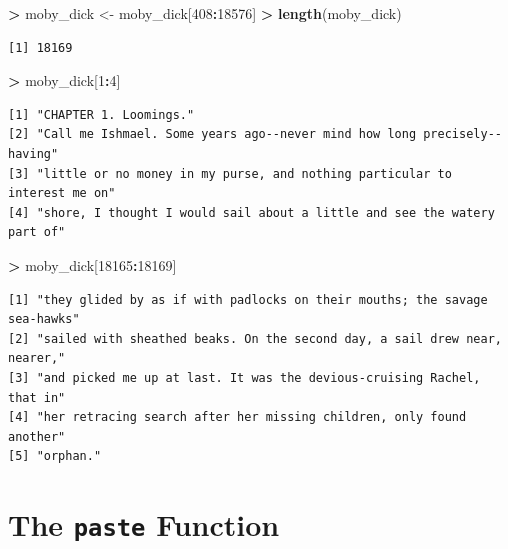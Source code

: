 \documentclass[
]{krantz}
\makeatletter
\newenvironment{Shaded}{\begin{snugshade}}{\end{snugshade}}
\newcommand{\DecValTok}[1]{\textcolor[rgb]{0.06,0.06,0.06}{#1}}
\newcommand{\KeywordTok}[1]{\textcolor[rgb]{0.27,0.27,0.27}{\textbf{#1}}}
\newcommand{\NormalTok}[1]{#1}
\newcommand{\OperatorTok}[1]{\textcolor[rgb]{0.43,0.43,0.43}{\textbf{#1}}}
\newcommand{\StringTok}[1]{\textcolor[rgb]{0.5,0.5,0.5}{#1}}
\newenvironment{kframe}{%
\medskip{}
\setlength{\fboxsep}{.8em}
 \def\at@end@of@kframe{}%
 \ifinner\ifhmode%
  \def\at@end@of@kframe{\end{minipage}}%
  \begin{minipage}{\columnwidth}%
 \fi\fi%
 \def\FrameCommand##1{\hskip\@totalleftmargin \hskip-\fboxsep
 \colorbox{shadecolor}{##1}\hskip-\fboxsep
     \hskip-\linewidth \hskip-\@totalleftmargin \hskip\columnwidth}%
 \MakeFramed {\advance\hsize-\width
   \@totalleftmargin\z@ \linewidth\hsize
   \@setminipage}}%
 {\par\unskip\endMakeFramed%
 \at@end@of@kframe}
\renewenvironment{Shaded}{\begin{kframe}}{\end{kframe}}
\makeatother
\begin{document}
\begin{Shaded}
\begin{Highlighting}[]
\OperatorTok{\textgreater{}}\StringTok{ }\NormalTok{moby\_dick \textless{}{-}}\StringTok{ }\NormalTok{moby\_dick[}\DecValTok{408}\OperatorTok{:}\DecValTok{18576}\NormalTok{]}
\OperatorTok{\textgreater{}}\StringTok{ }\KeywordTok{length}\NormalTok{(moby\_dick)}
\end{Highlighting}
\end{Shaded}

\begin{verbatim}
[1] 18169
\end{verbatim}

\begin{Shaded}
\begin{Highlighting}[]
\OperatorTok{\textgreater{}}\StringTok{ }\NormalTok{moby\_dick[}\DecValTok{1}\OperatorTok{:}\DecValTok{4}\NormalTok{]}
\end{Highlighting}
\end{Shaded}

\begin{verbatim}
[1] "CHAPTER 1. Loomings."                                                    
[2] "Call me Ishmael. Some years ago--never mind how long precisely--having"  
[3] "little or no money in my purse, and nothing particular to interest me on"
[4] "shore, I thought I would sail about a little and see the watery part of" 
\end{verbatim}

\begin{Shaded}
\begin{Highlighting}[]
\OperatorTok{\textgreater{}}\StringTok{ }\NormalTok{moby\_dick[}\DecValTok{18165}\OperatorTok{:}\DecValTok{18169}\NormalTok{]}
\end{Highlighting}
\end{Shaded}

\begin{verbatim}
[1] "they glided by as if with padlocks on their mouths; the savage sea-hawks"
[2] "sailed with sheathed beaks. On the second day, a sail drew near, nearer,"
[3] "and picked me up at last. It was the devious-cruising Rachel, that in"   
[4] "her retracing search after her missing children, only found another"     
[5] "orphan."                                                                 
\end{verbatim}

\hypertarget{the-paste-function}{%
\section{\texorpdfstring{The \texttt{paste} Function}{The paste Function}}\label{the-paste-function}}
\end{document}
